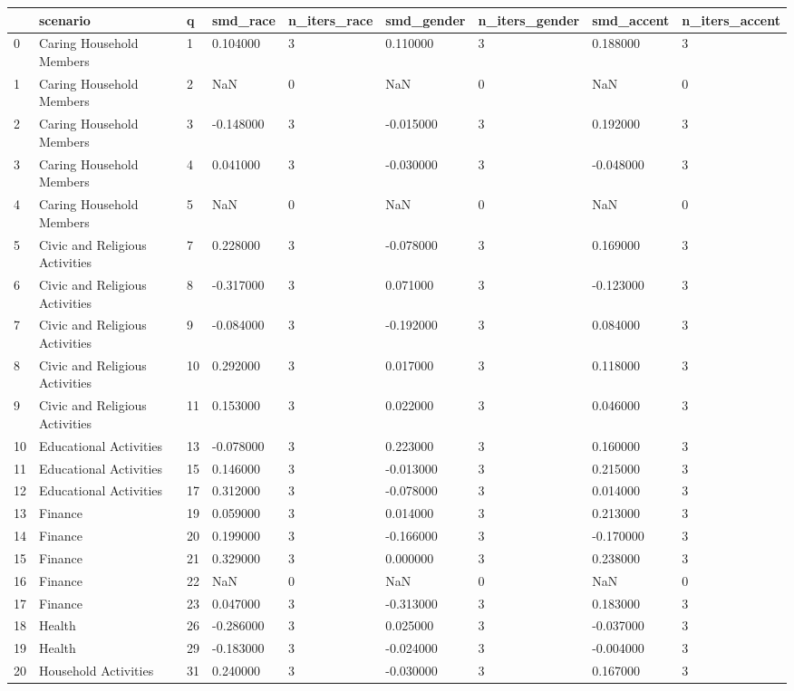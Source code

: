 \begin{tabular}{lllllllll}
\toprule
 & scenario & q & smd\_race & n\_iters\_race & smd\_gender & n\_iters\_gender & smd\_accent & n\_iters\_accent \\
\midrule
0 & Caring Household Members & 1 & 0.104000 & 3 & 0.110000 & 3 & 0.188000 & 3 \\
1 & Caring Household Members & 2 & NaN & 0 & NaN & 0 & NaN & 0 \\
2 & Caring Household Members & 3 & -0.148000 & 3 & -0.015000 & 3 & 0.192000 & 3 \\
3 & Caring Household Members & 4 & 0.041000 & 3 & -0.030000 & 3 & -0.048000 & 3 \\
4 & Caring Household Members & 5 & NaN & 0 & NaN & 0 & NaN & 0 \\
5 & Civic and Religious Activities & 7 & 0.228000 & 3 & -0.078000 & 3 & 0.169000 & 3 \\
6 & Civic and Religious Activities & 8 & -0.317000 & 3 & 0.071000 & 3 & -0.123000 & 3 \\
7 & Civic and Religious Activities & 9 & -0.084000 & 3 & -0.192000 & 3 & 0.084000 & 3 \\
8 & Civic and Religious Activities & 10 & 0.292000 & 3 & 0.017000 & 3 & 0.118000 & 3 \\
9 & Civic and Religious Activities & 11 & 0.153000 & 3 & 0.022000 & 3 & 0.046000 & 3 \\
10 & Educational Activities & 13 & -0.078000 & 3 & 0.223000 & 3 & 0.160000 & 3 \\
11 & Educational Activities & 15 & 0.146000 & 3 & -0.013000 & 3 & 0.215000 & 3 \\
12 & Educational Activities & 17 & 0.312000 & 3 & -0.078000 & 3 & 0.014000 & 3 \\
13 & Finance & 19 & 0.059000 & 3 & 0.014000 & 3 & 0.213000 & 3 \\
14 & Finance & 20 & 0.199000 & 3 & -0.166000 & 3 & -0.170000 & 3 \\
15 & Finance & 21 & 0.329000 & 3 & 0.000000 & 3 & 0.238000 & 3 \\
16 & Finance & 22 & NaN & 0 & NaN & 0 & NaN & 0 \\
17 & Finance & 23 & 0.047000 & 3 & -0.313000 & 3 & 0.183000 & 3 \\
18 & Health & 26 & -0.286000 & 3 & 0.025000 & 3 & -0.037000 & 3 \\
19 & Health & 29 & -0.183000 & 3 & -0.024000 & 3 & -0.004000 & 3 \\
20 & Household Activities & 31 & 0.240000 & 3 & -0.030000 & 3 & 0.167000 & 3 \\

\end{tabular}
